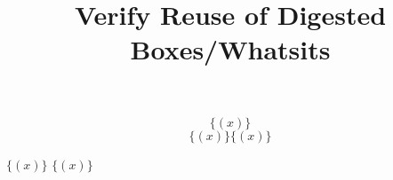 \documentclass{article}
\title{Verify Reuse of Digested Boxes/Whatsits}
\date{}
\def\brackets#1{\{#1\}}
\def\parens#1{(#1)}
\def\BoxDup#1{#1#1}
\def\SaveBox#1{\def\mysavedbox{#1}#1}
\def\UseBox{\mysavedbox}
\begin{document}
\maketitle
\[ \brackets{\parens{x}} \]
\[ \BoxDup{\brackets{\parens{x}}} \]

\SaveBox{$\brackets{\parens{x}}$}
\UseBox
\end{document}
